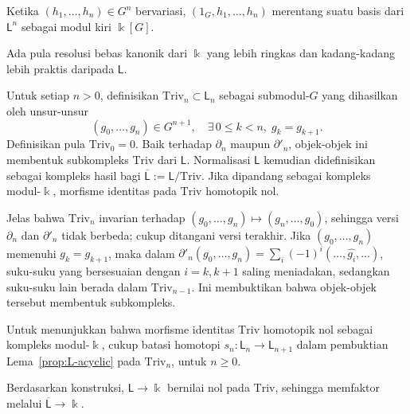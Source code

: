 \begin{bukti}
	Ketika $(h_1,\ldots,h_n)\in G^n$ bervariasi,
	$(1_G,h_1,\ldots,h_n)$ merentang suatu basis dari $\mathsf{L}^n$ sebagai
	modul kiri $\Bbbk[G]$.
\end{bukti}

Ada pula resolusi bebas kanonik dari $\Bbbk$ yang lebih ringkas dan kadang-kadang
lebih praktis daripada $\mathsf{L}$.

\begin{definisi-proposisi}
	Untuk setiap $n>0$, definisikan $\mathrm{Triv}_n\subset\mathsf{L}_n$ sebagai
	submodul-$G$ yang dihasilkan oleh unsur-unsur
	\[ (g_0, \ldots, g_n) \in G^{n+1}, \quad \exists\, 0 \leq k < n, \; g_k = g_{k+1}. \]
	Definisikan pula $\mathrm{Triv}_0=0$. Baik terhadap $\partial_n$ maupun
	$\partial'_n$, objek-objek ini membentuk subkompleks $\mathrm{Triv}$ dari
	$\mathsf{L}$. Normalisasi $\mathsf{L}$ kemudian didefinisikan sebagai
	kompleks hasil bagi
	$\overline{\mathsf{L}}:=\mathsf{L}/\mathrm{Triv}$. Jika dipandang sebagai
	kompleks modul-$\Bbbk$, morfisme identitas pada $\mathrm{Triv}$ homotopik nol.
\end{definisi-proposisi}

\begin{bukti}
	Jelas bahwa $\mathrm{Triv}_n$ invarian terhadap
	$(g_0,\ldots,g_n)\mapsto(g_n,\ldots,g_0)$, sehingga versi $\partial_n$ dan
	$\partial'_n$ tidak berbeda; cukup ditangani versi terakhir. Jika
	$(g_0,\ldots,g_n)$ memenuhi $g_k=g_{k+1}$, maka dalam
	$\partial'_n(g_0,\ldots,g_n)=
	\sum_i(-1)^i(\ldots,\widehat{g_i},\ldots)$, suku-suku yang bersesuaian dengan
	$i=k,k+1$ saling meniadakan, sedangkan suku-suku lain berada dalam
	$\mathrm{Triv}_{n-1}$. Ini membuktikan bahwa objek-objek tersebut membentuk
	subkompleks.

	Untuk menunjukkan bahwa morfisme identitas $\mathrm{Triv}$ homotopik nol
	sebagai kompleks modul-$\Bbbk$, cukup batasi homotopi
	$s_n:\mathsf{L}_n\to\mathsf{L}_{n+1}$ dalam pembuktian
	Lema~\ref{prop:L-acyclic} pada $\mathrm{Triv}_n$, untuk $n\geq0$.
\end{bukti}

Berdasarkan konstruksi, $\mathsf{L}\to\Bbbk$ bernilai nol pada
$\mathrm{Triv}$, sehingga memfaktor melalui
$\overline{\mathsf{L}}\to\Bbbk$.

